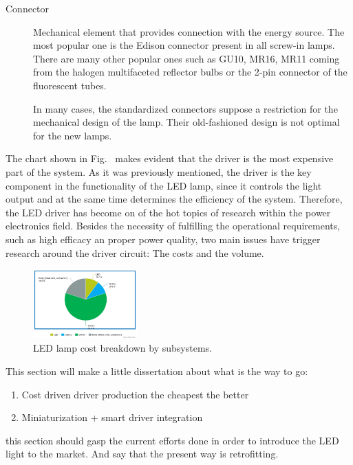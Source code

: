 \begin{description}
  \item[Connector] Mechanical element that provides connection with the energy source. The most popular one is the Edison connector present in all screw-in lamps. There are many other popular ones such as GU10, MR16, MR11 coming from the halogen multifaceted reflector bulbs or the 2-pin connector of the fluorescent tubes. 
      
      In many cases, the standardized connectors suppose a restriction for the mechanical design of the lamp. Their old-fashioned design is not optimal for the new lamps.
          
  
\end{description}

The chart shown in Fig.~ makes evident that the driver is the most expensive part of the system. As it was previously mentioned, the driver is the key component in the functionality of the LED lamp, since it controls the light output and at the same time determines the efficiency of the system. Therefore, the LED driver has become on of the hot topics of research within the power electronics field. Besides the necessity of fulfilling the operational requirements, such as high efficacy an proper power quality, two main issues have trigger research around the driver circuit: The costs and the volume. 

 


 \begin{figure}[!h]
\centering
\includegraphics[width=4cm]{./0_intro/img/piechar_costs.jpeg}
\caption{LED lamp cost breakdown by subsystems.}
\label{fig:cost_breakdown}
\end{figure}


This section will make a little dissertation about what is the way to go:
\begin{enumerate}
  \item Cost driven driver production the cheapest the better
  \item Miniaturization + smart driver integration
\end{enumerate}

this section should gasp the current efforts done in order to introduce the LED light to the market. And say that the present way is retrofitting.

